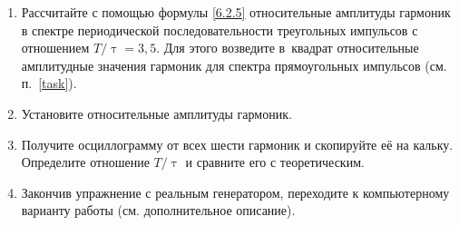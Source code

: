 \begin{lab:task}

\begin{enumerate}
	\item Рассчитайте с помощью формулы \eqref{6.2.5} относительные амплитуды гармоник в спектре периодической последовательности треугольных импульсов с отношением $T/\uptau=3,5$. Для этого возведите в~квадрат относительные амплитудные значения гармоник для спектра прямоугольных импульсов (см. п.~\ref{task}).
	\item Установите относительные амплитуды гармоник.
	\item Получите осциллограмму от всех шести гармоник и скопируйте её на кальку. Определите отношение $T/\uptau$ и сравните его с теоретическим.
	\item Закончив упражнение с реальным генератором, переходите к компьютерному варианту работы (см. дополнительное описание).
\end{enumerate}




\end{lab:task}
